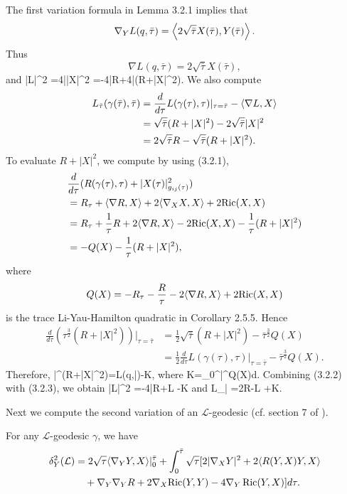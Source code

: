 The first variation formula in Lemma 3.2.1 implies that
$$
\nabla_YL(q,\bar{\tau}) =\left\langle2\sqrt{\bar{\tau}}X(\bar{\tau}),
Y(\bar{\tau})\right\rangle.
$$
Thus
$$
\nabla L(q,\bar{\tau}) =2\sqrt{\bar{\tau}}X(\bar{\tau}),
$$
and \be |\nabla L|^2 =4\bar{\tau}|X|^2
=-4\bar{\tau}R+4\bar{\tau}(R+|X|^2).%
\ee We also compute
\begin{align}
L_{\bar{\tau}}(\gamma(\bar{\tau}),\bar{\tau})& =
\frac{d}{d\tau}L(\gamma(\tau),\tau)|_{\tau=\bar{\tau}}
-\langle\nabla L,X\rangle\\
&  = \sqrt{\bar{\tau}}(R+|X|^2)-2\sqrt{\bar{\tau}}|X|^2 \nonumber\\
&  = 2\sqrt{\bar{\tau}}R-\sqrt{\bar{\tau}}(R+|X|^2).\nonumber
\end{align}
To evaluate $R+|X|^2$, we compute by using (3.2.1),
\begin{align*}
& \frac{d}{d\tau}(R(\gamma(\tau),\tau)+|X(\tau)|^2_{g_{ij}(\tau)})\\
& = R_\tau+\langle\nabla R,X\rangle+2\langle\nabla_XX,X\rangle+2{ \operatorname{Ric}}(X,X)\\
& = R_\tau+\frac{1}{\tau}R+2\langle\nabla R,X\rangle-2 {\operatorname{Ric}}(X,X)
-\frac{1}{\tau}(R+|X|^2)\\
&  = -Q(X)-\frac{1}{\tau}(R+|X|^2),
\end{align*}
where
$$
Q(X)=-R_\tau-\frac{R}{\tau}-2\langle\nabla R,X\rangle+2{ \operatorname{Ric}}(X,X)
$$
is the trace Li-Yau-Hamilton quadratic in Corollary 2.5.5. Hence
\begin{align*}
\frac{d}{d\tau}(\tau^\frac{3}{2}(R+|X|^2))|_{\tau=\bar{\tau}} &
=\frac{1}{2}\sqrt{\bar{\tau}}(R+|X|^2)
-\bar{\tau}^\frac{3}{2}Q(X)\\
&
=\frac{1}{2}\frac{d}{d\tau}L(\gamma(\tau),\tau)|_{\tau=\bar{\tau}}
-\bar{\tau}^\frac{3}{2}Q(X).
\end{align*}
Therefore, \be
\bar{\tau}^(R+|X|^2)=L(q,\bar{\tau})-K,
\ee where \be K=\int_0^{\bar{\tau}}\tau^Q(X)d\tau.
\ee Combining (3.2.2) with (3.2.3), we obtain \be |\nabla L|^2
=-4\bar{\tau}R+L
-K  %
\ee and \be L_{\bar{\tau}}
=2\sqrt{\bar{\tau}}R-L
+K.  %
\ee

Next we compute the second variation of an $\mathcal{L}$-geodesic
(cf. section 7 of \cite{P1}).

\begin{lemma}
  \label{lem:cz-second-variation-of-l-length}
For any $\mathcal{L}$-geodesic $\gamma$, we have
\begin{align*}
\delta_Y^2(\mathcal{L}) &
=2\sqrt{\tau}\langle\nabla_YY,X\rangle|_0^{\bar{\tau}}
+\int_0^{\bar{\tau}}\sqrt{\tau}[2|\nabla_XY|^2
+2\langle R(Y,X)Y,X\rangle\\
&\quad +\nabla_Y\nabla_YR+2\nabla_X{\operatorname{Ric}}(Y,Y)-4\nabla_Y
\operatorname{Ric}(Y,X)]d\tau.
\end{align*}
\end{lemma}

